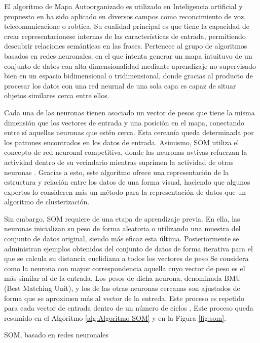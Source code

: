 \documentclass[10pt, a4paper]{article}
\begin{document}
El algoritmo de Mapa Autoorganizado es utilizado en Inteligencia artificial y propuesto en \cite{som} ha sido aplicado en diversos campos como reconcimiento de voz, telecomunicacione o robtica. Su cualidad principal es que tiene la capacidad de crear representacionese internas de las características de entrada, permitiendo descubrir relaciones semánticas en las frases. Pertenece al grupo de algoritmos basados en redes neuronales, en el que intenta generar un mapa intuituvo de un conjunto de datos con alta dimensionalidad mediante aprendizaje no supervisado bien en un espacio bidimensional o tridimensional, donde gracias al producto de procesar los datos con una red neurnal de una sola capa es capaz de situar objetos similares cerca entre ellos. 

Cada una de las neuronas tienen asociado un vector de pesos que tiene la misma dimensión que los vectores de entrada y una posición en el mapa, conectando entre sí aquellas neuronas que estén cerca. Esta cercanía queda determinada por los patrones encontrados en los datos de entrada. Asimismo, SOM utiliza el concepto de red neuronal competitiva, donde las neuronas avtivas refuerzan la actividad dentro de su vecindario mientras suprimen la actividad de otras neuronas \cite{survey text}. Gracias a esto, este algoritmo ofrece una representación de la estructura y relación entre los datos de una forma visual, haciendo que algunos expertos lo consideren más un método para la representación de datos que un algoritmo de clusterización. 

Sin embargo, SOM requiere de una etapa de aprendizaje previa. En ella, las neuronas inicializan su peso de forma aleatoria o utilizando una muestra del conjunto de datos original, siendo más eficaz esta última. Posteriormente se administran ejemplos obtenidos del conjunto de datos de forma iterativa para el que se calcula su distancia euclidiana a todos los vectores de peso Se considera como la neurona con mayor correspondencia aquella cuyo vector de peso es el más similar al de la entrada. Los pesos de dicha neurona, denominada BMU (Best Matching Unit), y los de las otras neuronas cercanas son ajustados de forma que se aproximen más al vector de la entreda. Este proceso es repetido para cada vector de entrada dentro de un número de ciclos \cite{articulo14}. Este proceso queda resumido en el Algoritmo \ref{alg:Algoritmo SOM} y en la Figura \ref{fig:som}.


\begin{algorithm}[!ht]
\SetAlgoLined
  \LinesNumbered
  \DontPrintSemicolon
  \caption{SOM, basado en redes neuronales}
  \label{alg:Algoritmo SOM}
\end{algorithm}
\end{document}
